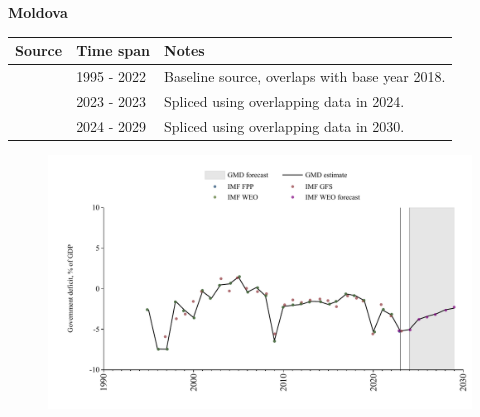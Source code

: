 \documentclass[12pt,a4paper,landscape]{article}
\begin{document}
\begin{adjustbox}{max totalsize={\paperwidth}{\paperheight},center}
\begin{minipage}[t][\textheight][t]{\textwidth}
\vspace*{0.5cm}
{}
\begin{center}
{\Large\bfseries Moldova}
\end{center}
\vspace{0.5cm}
\begin{table}[H]
\centering
\small
\begin{tabular}{|l|l|l|}
\hline
\textbf{Source} & \textbf{Time span} & \textbf{Notes} \\
\hline
\rowcolor{white}\cite{IMF_WEO}& 1995 - 2022 &Baseline source, overlaps with base year 2018.\\
\rowcolor{lightgray}\cite{IMF_GFS}& 2023 - 2023 &Spliced using overlapping data in 2024.\\
\rowcolor{white}\cite{IMF_WEO_forecast}& 2024 - 2029 &Spliced using overlapping data in 2030.\\
\hline
\end{tabular}
\end{table}
\begin{figure}[H]
\centering
\includegraphics[width=\textwidth,height=0.6\textheight,keepaspectratio]{graphs/MDA_govdef_GDP.pdf}
\end{figure}
\end{minipage}
\end{adjustbox}
\end{document}
